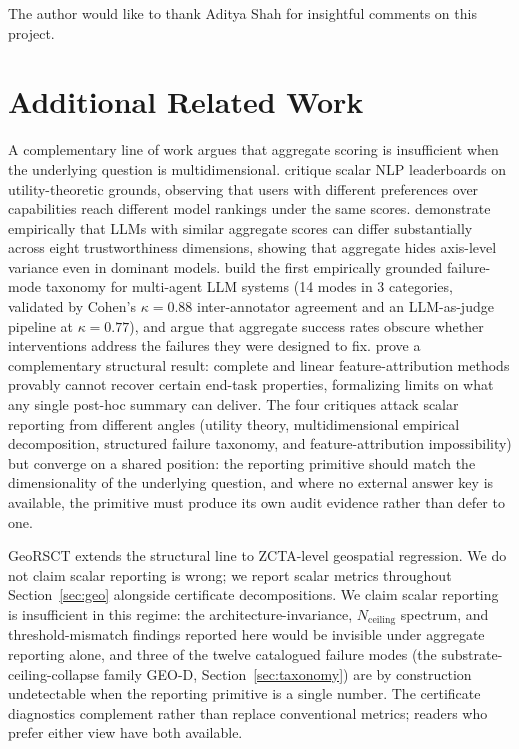 \documentclass{article}
\begin{document}
The author would like to thank Aditya Shah for insightful comments on this project.




\appendix

\section{Additional Related Work}
\label{app:additional_related}

A complementary line of work argues that aggregate scoring is insufficient when the underlying question is multidimensional. \citet{ethayarajh2020utility} critique scalar NLP leaderboards on utility-theoretic grounds, observing that users with different preferences over capabilities reach different model rankings under the same scores. \citet{wang2023decodingtrust} demonstrate empirically that LLMs with similar aggregate scores can differ substantially across eight trustworthiness dimensions, showing that aggregate hides axis-level variance even in dominant models. \citet{cemri2025mast} build the first empirically grounded failure-mode taxonomy for multi-agent LLM systems (14 modes in 3 categories, validated by Cohen's $\kappa = 0.88$ inter-annotator agreement and an LLM-as-judge pipeline at $\kappa = 0.77$), and argue that aggregate success rates obscure whether interventions address the failures they were designed to fix. \citet{bilodeau2024impossibility} prove a complementary structural result: complete and linear feature-attribution methods provably cannot recover certain end-task properties, formalizing limits on what any single post-hoc summary can deliver. The four critiques attack scalar reporting from different angles (utility theory, multidimensional empirical decomposition, structured failure taxonomy, and feature-attribution impossibility) but converge on a shared position: the reporting primitive should match the dimensionality of the underlying question, and where no external answer key is available, the primitive must produce its own audit evidence rather than defer to one.

GeoRSCT extends the structural line to ZCTA-level geospatial regression. We do not claim scalar reporting is wrong; we report scalar metrics throughout Section~\ref{sec:geo} alongside certificate decompositions. We claim scalar reporting is insufficient in this regime: the architecture-invariance, $N_{\text{ceiling}}$ spectrum, and threshold-mismatch findings reported here would be invisible under aggregate reporting alone, and three of the twelve catalogued failure modes (the substrate-ceiling-collapse family GEO-D, Section~\ref{sec:taxonomy}) are by construction undetectable when the reporting primitive is a single number. The certificate diagnostics complement rather than replace conventional metrics; readers who prefer either view have both available.
\end{document}
